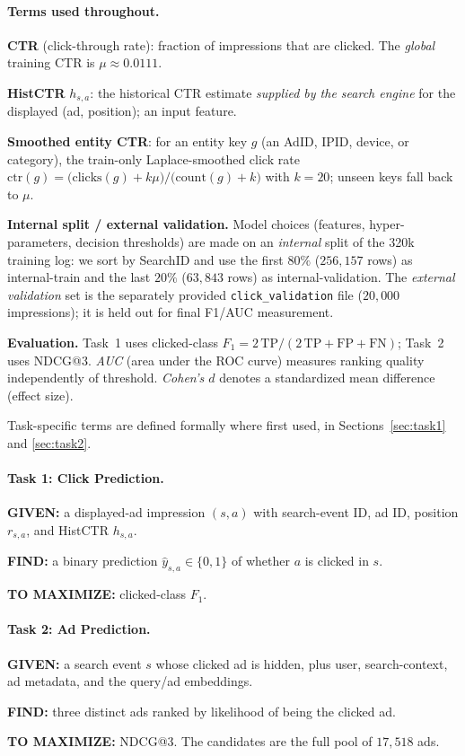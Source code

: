 \documentclass[sigconf, nonacm]{acmart}
\begin{document}
\paragraph{Terms used throughout.}
\bit
\item \textbf{CTR} (click-through rate): fraction of impressions that are
clicked. The \emph{global} training CTR is $\mu\approx0.0111$.
\item \textbf{HistCTR} $h_{s,a}$: the historical CTR estimate \emph{supplied by
the search engine} for the displayed (ad, position); an input feature.
\item \textbf{Smoothed entity CTR}: for an entity key $g$ (an AdID, IPID,
device, or category), the train-only Laplace-smoothed click rate
$\mathrm{ctr}(g)=\big(\mathrm{clicks}(g)+k\mu\big)/\big(\mathrm{count}(g)+k\big)$
with $k=20$; unseen keys fall back to $\mu$.
\item \textbf{Internal split / external validation.} Model choices
(features, hyper-parameters, decision thresholds) are made on an
\emph{internal} split of the 320k training log: we sort by SearchID and use the
first $80\%$ ($256{,}157$ rows) as internal-train and the last $20\%$
($63{,}843$ rows) as internal-validation. The \emph{external validation} set is
the separately provided \texttt{click\_validation} file ($20{,}000$
impressions); it is held out for final F1/AUC measurement.
\item \textbf{Evaluation.} Task~1 uses clicked-class
$F_1=2\,\mathrm{TP}/(2\,\mathrm{TP}+\mathrm{FP}+\mathrm{FN})$; Task~2 uses
NDCG@3. \emph{AUC} (area under the ROC curve) measures ranking quality
independently of threshold. \emph{Cohen's $d$} denotes a standardized mean
difference (effect size).
\item Task-specific terms are defined formally where first
used, in Sections~\ref{sec:task1} and \ref{sec:task2}.
\eit

\paragraph{Task 1: Click Prediction.}
\bit
\item \textbf{GIVEN:} a displayed-ad impression $(s,a)$ with search-event ID,
ad ID, position $r_{s,a}$, and HistCTR $h_{s,a}$.
\item \textbf{FIND:} a binary prediction $\hat{y}_{s,a}\in\{0,1\}$ of whether $a$
is clicked in $s$.
\item \textbf{TO MAXIMIZE:} clicked-class $F_1$.
\eit

\paragraph{Task 2: Ad Prediction.}
\bit
\item \textbf{GIVEN:} a search event $s$ whose clicked ad is hidden, plus user,
search-context, ad metadata, and the query/ad embeddings.
\item \textbf{FIND:} three distinct ads ranked by likelihood of being the
clicked ad.
\item \textbf{TO MAXIMIZE:} NDCG@3.
\eit
The candidates are the full pool of $17{,}518$ ads.
\end{document}
